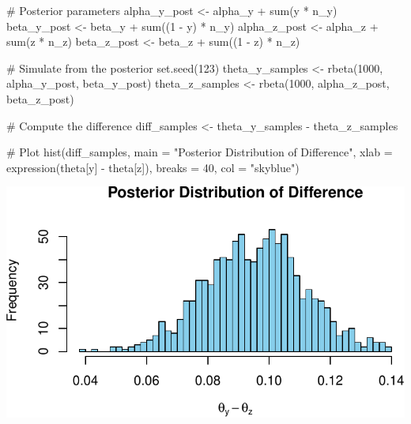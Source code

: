 \documentclass[
  10pt,
]{article}
\newenvironment{Shaded}{\begin{snugshade}}{\end{snugshade}}
\newcommand{\AttributeTok}[1]{\textcolor[rgb]{0.40,0.45,0.13}{#1}}
\newcommand{\CommentTok}[1]{\textcolor[rgb]{0.37,0.37,0.37}{#1}}
\newcommand{\DecValTok}[1]{\textcolor[rgb]{0.68,0.00,0.00}{#1}}
\newcommand{\FunctionTok}[1]{\textcolor[rgb]{0.28,0.35,0.67}{#1}}
\newcommand{\NormalTok}[1]{\textcolor[rgb]{0.00,0.23,0.31}{#1}}
\newcommand{\OtherTok}[1]{\textcolor[rgb]{0.00,0.23,0.31}{#1}}
\newcommand{\SpecialCharTok}[1]{\textcolor[rgb]{0.37,0.37,0.37}{#1}}
\newcommand{\StringTok}[1]{\textcolor[rgb]{0.13,0.47,0.30}{#1}}
\begin{document}
\begin{Shaded}
\begin{Highlighting}[]
\CommentTok{\# Posterior parameters}
\NormalTok{alpha\_y\_post }\OtherTok{\textless{}{-}}\NormalTok{ alpha\_y }\SpecialCharTok{+} \FunctionTok{sum}\NormalTok{(y }\SpecialCharTok{*}\NormalTok{ n\_y)}
\NormalTok{beta\_y\_post }\OtherTok{\textless{}{-}}\NormalTok{ beta\_y }\SpecialCharTok{+} \FunctionTok{sum}\NormalTok{((}\DecValTok{1} \SpecialCharTok{{-}}\NormalTok{ y) }\SpecialCharTok{*}\NormalTok{ n\_y)}
\NormalTok{alpha\_z\_post }\OtherTok{\textless{}{-}}\NormalTok{ alpha\_z }\SpecialCharTok{+} \FunctionTok{sum}\NormalTok{(z }\SpecialCharTok{*}\NormalTok{ n\_z)}
\NormalTok{beta\_z\_post }\OtherTok{\textless{}{-}}\NormalTok{ beta\_z }\SpecialCharTok{+} \FunctionTok{sum}\NormalTok{((}\DecValTok{1} \SpecialCharTok{{-}}\NormalTok{ z) }\SpecialCharTok{*}\NormalTok{ n\_z)}

\CommentTok{\# Simulate from the posterior}
\FunctionTok{set.seed}\NormalTok{(}\DecValTok{123}\NormalTok{)}
\NormalTok{theta\_y\_samples }\OtherTok{\textless{}{-}} \FunctionTok{rbeta}\NormalTok{(}\DecValTok{1000}\NormalTok{, alpha\_y\_post, beta\_y\_post)}
\NormalTok{theta\_z\_samples }\OtherTok{\textless{}{-}} \FunctionTok{rbeta}\NormalTok{(}\DecValTok{1000}\NormalTok{, alpha\_z\_post, beta\_z\_post)}

\CommentTok{\# Compute the difference}
\NormalTok{diff\_samples }\OtherTok{\textless{}{-}}\NormalTok{ theta\_y\_samples }\SpecialCharTok{{-}}\NormalTok{ theta\_z\_samples}

\CommentTok{\# Plot}
\FunctionTok{hist}\NormalTok{(diff\_samples, }\AttributeTok{main =} \StringTok{"Posterior Distribution of Difference"}\NormalTok{,}
     \AttributeTok{xlab =} \FunctionTok{expression}\NormalTok{(theta[y] }\SpecialCharTok{{-}}\NormalTok{ theta[z]), }\AttributeTok{breaks =} \DecValTok{40}\NormalTok{, }\AttributeTok{col =} \StringTok{"skyblue"}\NormalTok{)}
\end{Highlighting}
\end{Shaded}

\includegraphics{551-HW-Q1_files/figure-pdf/unnamed-chunk-1-1.pdf}
\end{document}
